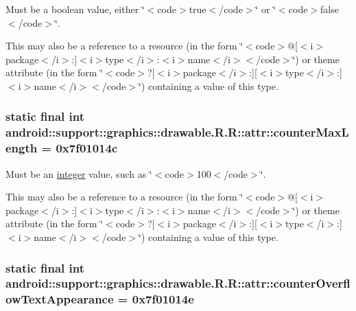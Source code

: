 Must be a boolean value, either \char`\"{}$<$code$>$true$<$/code$>$\char`\"{} or \char`\"{}$<$code$>$false$<$/code$>$\char`\"{}. 

This may also be a reference to a resource (in the form \char`\"{}$<$code$>$@\mbox{[}$<$i$>$package$<$/i$>$:\mbox{]}$<$i$>$type$<$/i$>$:$<$i$>$name$<$/i$>$$<$/code$>$\char`\"{}) or theme attribute (in the form \char`\"{}$<$code$>$?\mbox{[}$<$i$>$package$<$/i$>$:\mbox{]}\mbox{[}$<$i$>$type$<$/i$>$:\mbox{]}$<$i$>$name$<$/i$>$$<$/code$>$\char`\"{}) containing a value of this type. \hypertarget{classandroid_1_1support_1_1graphics_1_1drawable_1_1_r_1_1attr_0f9c0e0f6f51d857295aa8e272d8d8f3}{
\subsubsection[{counterMaxLength}]{\setlength{\rightskip}{0pt plus 5cm}static final int android::support::graphics::drawable.R.R::attr::counterMaxLength = 0x7f01014c}}
\label{classandroid_1_1support_1_1graphics_1_1drawable_1_1_r_1_1attr_0f9c0e0f6f51d857295aa8e272d8d8f3}


Must be an \hyperlink{classandroid_1_1support_1_1graphics_1_1drawable_1_1_r_1_1integer}{integer} value, such as \char`\"{}$<$code$>$100$<$/code$>$\char`\"{}. 

This may also be a reference to a resource (in the form \char`\"{}$<$code$>$@\mbox{[}$<$i$>$package$<$/i$>$:\mbox{]}$<$i$>$type$<$/i$>$:$<$i$>$name$<$/i$>$$<$/code$>$\char`\"{}) or theme attribute (in the form \char`\"{}$<$code$>$?\mbox{[}$<$i$>$package$<$/i$>$:\mbox{]}\mbox{[}$<$i$>$type$<$/i$>$:\mbox{]}$<$i$>$name$<$/i$>$$<$/code$>$\char`\"{}) containing a value of this type. \hypertarget{classandroid_1_1support_1_1graphics_1_1drawable_1_1_r_1_1attr_a976ba54a8876e6cf2b496978f975545}{
\subsubsection[{counterOverflowTextAppearance}]{\setlength{\rightskip}{0pt plus 5cm}static final int android::support::graphics::drawable.R.R::attr::counterOverflowTextAppearance = 0x7f01014e}}
\label{classandroid_1_1support_1_1graphics_1_1drawable_1_1_r_1_1attr_a976ba54a8876e6cf2b496978f975545}


